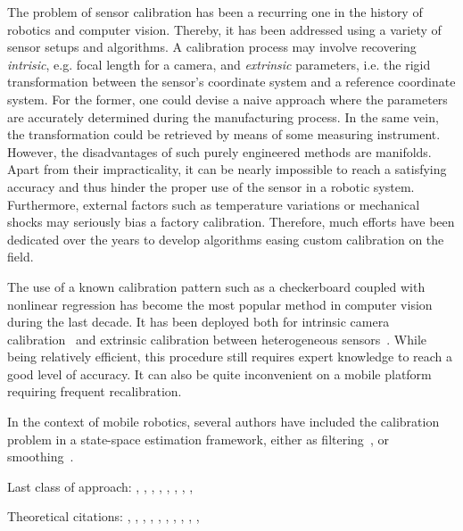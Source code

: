 The problem of sensor calibration has been a recurring one in the history of
robotics and computer vision. Thereby, it has been addressed using a
variety of sensor setups and algorithms. A calibration process may involve
recovering \emph{intrisic}, e.g. focal length for a camera, and \emph{extrinsic}
parameters, i.e. the rigid transformation between the sensor's coordinate system
and a reference coordinate system. For the former, one could devise a naive
approach where the parameters are accurately determined during the manufacturing
process. In the same vein, the transformation could be retrieved by means of
some measuring instrument. However, the disadvantages of such purely
engineered methods are manifolds. Apart from their impracticality, it can be
nearly impossible to reach a satisfying accuracy and thus hinder the proper use
of the sensor in a robotic system. Furthermore, external factors such as
temperature variations or mechanical shocks may seriously bias a factory
calibration. Therefore, much efforts have been dedicated over the years to
develop algorithms easing custom calibration on the field.

The use of a known calibration pattern such as a checkerboard coupled with
nonlinear regression has become the most popular method in computer vision
during the last decade. It has been deployed both for intrinsic camera
calibration~\cite{sturm99plane} and extrinsic calibration
between heterogeneous sensors~\cite{zhang04extrinsic}. While being relatively
efficient, this procedure still requires expert knowledge to reach a good level
of accuracy. It can also be quite inconvenient on a mobile platform requiring
frequent recalibration.

In the context of mobile robotics, several authors have included the calibration
problem in a state-space estimation framework,
either as filtering~\cite{martinelli06automatic}, or
smoothing~\cite{kuemmerle11simultaneous}.

Last class of approach: \cite{brookshire12extrinsic}, \cite{brookshire11automatic}, \cite{maddern12lost},
\cite{sheehan12self}, \cite{sheehan10automatic}, \cite{levinson10unsupervised}, \cite{gao10online},
\cite{hol10modeling},

Theoretical citations: \cite{davis11algorithm}, \cite{aster11parameter},
\cite{chan94lowrank}, \cite{finsterle11truncated}, \cite{golub96matrix},
\cite{hansen87truncated}, \cite{hong92rank}, \cite{jauffret07observability},
\cite{kitagawa01regularization},
\cite{mackay05information}, 
 \cite{kaess09covariance}
